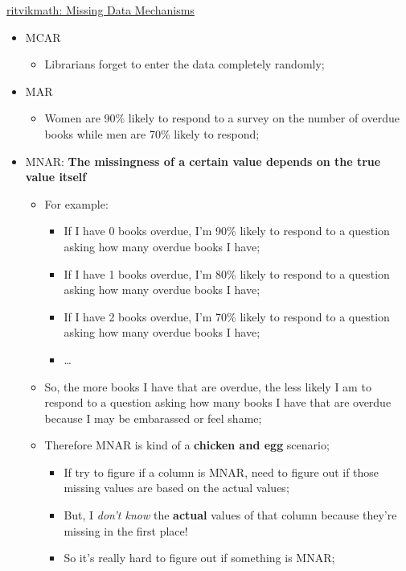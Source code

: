 \documentclass[12pt, titlepage, french]{report}
\begin{document}
\begin{YTB_SUMM_AUTO_NUMB}[label = {rvm-MCAR-etal}]{\href{https://www.youtube.com/watch?v=XnnA9z7lv4Q}{ritvikmath: Missing Data Mechanisms
}}
\begin{itemize}[leftmargin = *]
	\item	MCAR
		\begin{itemize}
		\item	Librarians forget to enter the data completely randomly;
		\end{itemize}
	\item	MAR
		\begin{itemize}
		\item	Women are 90\% likely to respond to a survey on the number of overdue books while men are 70\% likely to respond;
		\end{itemize}
	\item	MNAR: \textbf{The missingness of a certain value depends on the true value itself}
		\begin{itemize}
		\item	For example:
			\begin{itemize}
			\item	If I have 0 books overdue, I'm 90\% likely to respond to a question asking how many overdue books I have;
			\item	If I have 1 books overdue, I'm 80\% likely to respond to a question asking how many overdue books I have;
			\item	If I have 2 books overdue, I'm 70\% likely to respond to a question asking how many overdue books I have;
			\item	\dots
			\end{itemize}
		\item	So, the more books I have that are overdue, the less likely I am to respond to a question asking how many books I have that are overdue because I may be embarassed or feel shame;
		\item	Therefore MNAR is kind of a \textbf{chicken and egg} scenario;
			\begin{itemize}
				\item	If try to figure if a column is MNAR, need to figure out if those missing values are based on the actual values;
				\item	But, I \textit{don't know} the \textbf{actual} values of that column because they're missing in the first place!
				\item	So it's really hard to figure out if something is MNAR;
			\end{itemize}

\end{itemize}
\end{itemize}
\end{YTB_SUMM_AUTO_NUMB}
\end{document}

